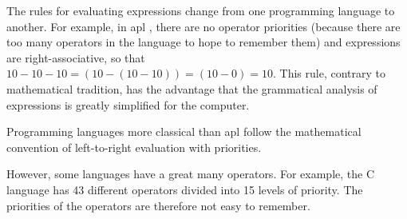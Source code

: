 {\begin{minipage}{\myparboxwidth}
\smallskip

The rules for evaluating expressions change from one programming language to another.
For example, in {\sc apl} \cite{iverson1}, there are no operator priorities (because there are
too many operators in the language to hope to remember them) and expressions are right-associative,
so that $10 - 10 - 10 = (10 - (10 - 10)) = (10 - 0) = 10$. This rule, contrary
to mathematical tradition, has the advantage that the grammatical analysis of expressions is greatly
simplified for the computer.

Programming languages more classical than {\sc apl} fol\-low the mathematical
convention of left-to-right evaluation with priorities.


However, some languages have a great many operators.
For example, the {\sc C} language \cite{kernighan1} has 43 different operators divided into
15 lev\-els of pri\-or\-i\-ty.
The priorities of the operators are therefore not easy to remember.

\vspace{\abovedisplayskip}
\end{minipage}
}

\noindent {}
